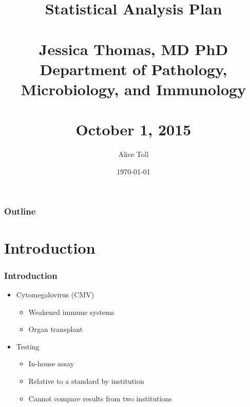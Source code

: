 \documentclass[xcolor=dvipsnames]{beamer}
\title[SAP]{Statistical Analysis Plan \\~\\
\large Jessica Thomas, MD PhD\\
\normalsize Department of Pathology, Microbiology, and Immunology \\~\\
 October 1, 2015}
\author{Alice Toll} %
\date{\today} %
\begin{document}
\begin{frame}
\titlepage %
\end{frame}
%



\begin{frame}
\frametitle{Outline}
	\tableofcontents
\end{frame}



\section{Introduction}

\begin{frame}
\frametitle{Introduction}
\begin{itemize}
 \item Cytomegalovirus (CMV)
        \begin{itemize}
        \item Weakened immune systems
        \item Organ transplant
        \end{itemize}
\item Testing
        \begin{itemize}
        \item In-house assay
        \item Relative to a standard by institution
        \item Cannot compare results from two institutions
        \end{itemize}
\end{itemize}
\end{frame}
\end{document}
